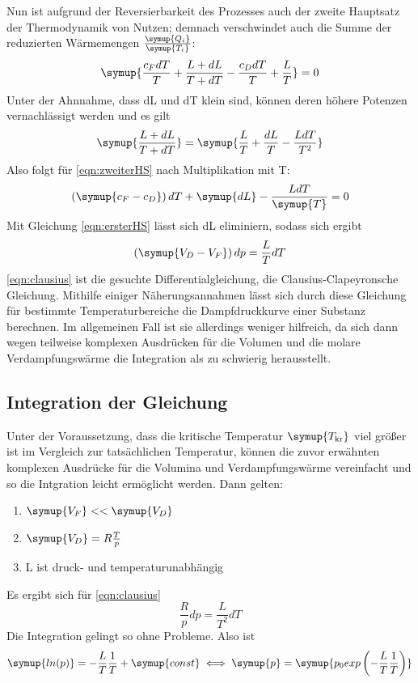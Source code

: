 Nun ist aufgrund der Reversierbarkeit des Prozesses auch der zweite Hauptsatz der
Thermodynamik von Nutzen; demnach verschwindet auch die Summe der reduzierten
Wärmemengen $\frac{\symup{Q_i}}{\symup{T_i}}$:
\begin{equation}
\symup{\frac{c_F dT}{T} + \frac{L + dL}{T + dT} - \frac{c_D dT}{T} + \frac{L}{T}} = 0
\label{eqn:zweiterHS}
\end{equation}
Unter der Ahnnahme, dass dL und dT klein sind, können deren höhere Potenzen 
vernachlässigt werden und es gilt
\begin{equation}
\symup{\frac{L + dL}{T + dT}} = \symup{\frac{L}{T} + \frac{dL}{T} - \frac{L dT}{T^2}}
\end{equation}
Also folgt für \eqref{eqn:zweiterHS} nach Multiplikation mit T:
\begin{equation}
\left( \symup{c_F - c_D} \right) dT + \symup{dL} - \frac{L dT}{\symup{T}} = 0
\end{equation}
Mit Gleichung \eqref{eqn:ersterHS} lässt sich dL eliminiern, sodass sich ergibt
\begin{equation}
\left( \symup{ V_D - V_F} \right) dp = \frac{L}{T} dT
\label{eqn:clausius}
\end{equation}
\eqref{eqn:clausius} ist die gesuchte Differentialgleichung, die Clausius-Clapeyronsche
Gleichung. Mithilfe einiger Näherungsannahmen lässt sich durch diese Gleichung
für bestimmte Temperaturbereiche die Dampfdruckkurve einer Substanz berechnen. Im 
allgemeinen Fall ist sie allerdings weniger hilfreich, da sich dann wegen teilweise
komplexen Ausdrücken für die Volumen und die molare Verdampfungswärme die Integration
als zu schwierig herausstellt.

\subsection{Integration der Gleichung}
Unter der Voraussetzung, dass die kritische Temperatur $\symup{T_\text{kr}}$ viel größer
ist im Vergleich zur tatsächlichen Temperatur, können die zuvor erwähnten komplexen
Ausdrücke für die Volumina und Verdampfungswärme vereinfacht und so die Intgration 
leicht ermöglicht werden. Dann gelten:
\begin{enumerate}
    \item $\symup{V_F} << \symup{V_D}$
    \item $\symup{V_D} = R \frac{T}{p}$
    \item L ist druck- und temperaturunabhängig
\end{enumerate}
Es ergibt sich für \eqref{eqn:clausius}
\begin{equation*}
\frac{R}{p} dp = \frac{L}{T^2} dT
\end{equation*}
Die Integration gelingt so ohne Probleme. Also ist
\begin{equation}
\symup{ln(p)} = - \frac{L}{T} \frac{1}{T} + \symup{const}\\
\iff \symup{p} = \symup{p_0 exp \left( - \frac{L}{T} \frac{1}{T} \right)}
\end{equation}
